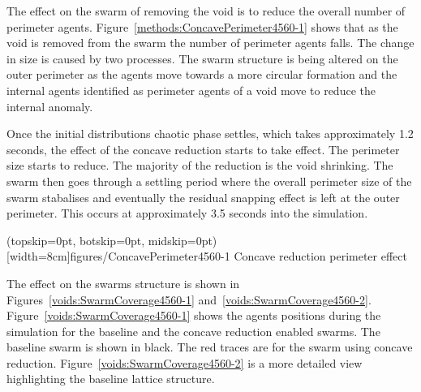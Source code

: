 \documentclass{ieeeaccess}
\begin{document}

The effect on the swarm of removing the void is to reduce the overall number of perimeter agents. Figure~\ref{methods:ConcavePerimeter4560-1} shows that as the void is removed from the swarm the number of perimeter agents falls. The change in size is caused by two processes. The swarm structure is being altered on the outer perimeter as the agents move towards a more circular formation and the internal agents identified as perimeter agents of a void move to reduce the internal anomaly. 

Once the initial distributions chaotic phase settles, which takes approximately 1.2 seconds, the effect of the concave reduction starts to take effect. The perimeter size starts to reduce. The majority of the reduction is the void shrinking. The swarm then goes through a settling period where the overall perimeter size of the swarm stabalises and eventually the residual snapping effect is left at the outer perimeter. This occurs at approximately 3.5 seconds into the simulation. 

\Figure[t!](topskip=0pt, botskip=0pt, midskip=0pt)[width=8cm]{figures/ConcavePerimeter4560-1}
{Concave reduction perimeter effect\label{methods:ConcavePerimeter4560-1}}


The effect on the swarms structure is shown in Figures~\ref{voids:SwarmCoverage4560-1} and~\ref{voids:SwarmCoverage4560-2}. Figure~\ref{voids:SwarmCoverage4560-1} shows the agents positions during the simulation for the baseline and the concave reduction enabled swarms. The baseline swarm is shown in black. The red traces are for the swarm using concave reduction. Figure~\ref{voids:SwarmCoverage4560-2} is a more detailed view highlighting the baseline lattice structure.
\end{document}
